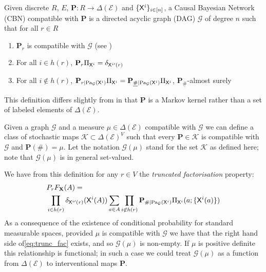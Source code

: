 \begin{definition}\label{def:CBN}

Given discrete $R$, $E$, $\mathbf{P}:R\to \Delta(\mathcal{E})$ and $\{\mathsf{X}^i\}_{i\in [n]}$, a Causal Bayesian Network (CBN) compatible with $\mathbf{P}$ is a directed acyclic graph (DAG) $\mathcal{G}$ of degree $n$ such that for all $r\in R$

\begin{enumerate}
    \item $\mathbf{P}_r$ is compatible with $\mathcal{G}$ (see \citet{pearl_causality:_2009})
    \item For all $i\in h(r)$, $\mathbf{P}_r \Pi_{\mathsf{X}^i}=\delta_{\mathsf{X}^{i\prime}(r)}$
    \item For all $i\not \in h(r)$, $\mathbf{P}_{r|\text{Pa}_{\mathcal{G}}(\mathsf{X}^i)} \Pi_{\mathsf{X}^i}=\mathbf{P}_{\underline{\#}|\text{Pa}_{\mathcal{G}}(\mathsf{X}^i)}\Pi_{\mathsf{X}^i} $, $\mathbf{P}_{\underline{\#}}$-almost surely
\end{enumerate}
\end{definition}

This definition differs slightly from \citet{pearl_causality:_2009} in that $\mathbf{P}$ is a Markov kernel rather than a set of labeled elements of $\Delta(\mathcal{E})$.

Given a graph $\mathcal{G}$ and a measure $\mu\in \Delta(\mathcal{E})$ compatible with $\mathcal{G}$ we can define a class of stochastic maps $\mathscr{K}\subset \Delta(\mathcal{E})^V$ such that every $\mathbf{P}\in \mathscr{K}$ is compatible with $\mathcal{G}$ and $\mathbf{P}(\#)=\mu$. Let the notation $\mathcal{G}(\mu)$ stand for the set $\mathscr{K}$ as defined here; note that $\mathcal{G}(\mu)$ is in general set-valued. 

We have from this definition for any $r\in V$ the \emph{truncated factorisation} property:
\begin{align}
	&P_r F_{\mathbf{X}}(A) =\nonumber\\
	 &\prod_{i\in h(r)} \delta_{\mathsf{X}^{i\prime} (r)} (\mathsf{X}^i(A)) \sum_{a\in A} \prod_{i\not \in h(r)} \mathbf{P}_{\#|\text{Pa}_{\mathcal{G}}(\mathsf{X}^i)} \Pi_{\mathsf{X}^i} (a;\{\mathsf{X}^i(a)\})\label{eq:trunc_fac}
\end{align}
As a consequence of the existence of conditional probability for standard measurable spaces, provided $\mu$ is compatible with $\mathcal{G}$ we have that the right hand side of\ref{eq:trunc_fac} exists, and so $\mathcal{G}(\mu)$ is non-empty. If $\mu$ is positive definite this relationship is functional; in such a case we could treat $\mathcal{G}(\mu)$ as a function from $\Delta(\mathcal{E})$ to interventional maps $\mathbf{P}$.


